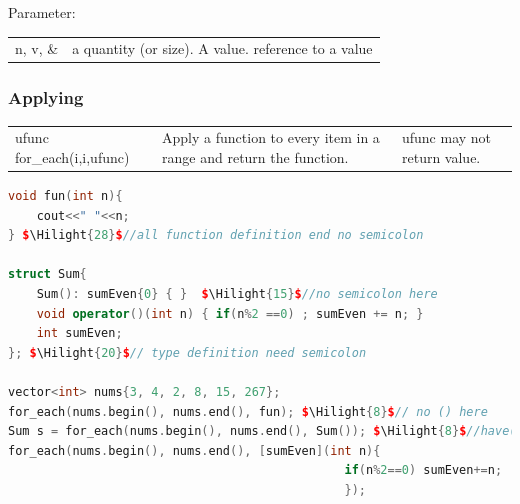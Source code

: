 \documentclass[a4paper,11pt,twoside]{book}
\newcommand{\Hilight}[1]{\makebox[0pt][l]{\color{yellow}\rule[-3pt]{#1em}{11pt}}}
\newcommand{\Hilight}[1]{}
\renewcommand{\hline}{}
\begin{document}
Parameter:  \\
\begin{tabular}{| p{} |p{}|}
\hline n, v, \&  & 	a quantity (or size). A value. reference to a value \\
\hline
\end{tabular}

\subsubsection{Applying}
\begin{tabular}{| p{} |p{}|p{}|}
\hline ufunc for\_each(i,i,ufunc) &Apply a function to every item in a range and return the function. &  ufunc may not return value.  \\
\hline
\end{tabular}

\begin{lstlisting}[frame=single, language=c++, mathescape=true]
void fun(int n){
    cout<<" "<<n;
} $\Hilight{28}$//all function definition end no semicolon

struct Sum{
    Sum(): sumEven{0} { }  $\Hilight{15}$//no semicolon here
    void operator()(int n) { if(n%2 ==0) ; sumEven += n; }
    int sumEven;
}; $\Hilight{20}$// type definition need semicolon

vector<int> nums{3, 4, 2, 8, 15, 267};
for_each(nums.begin(), nums.end(), fun); $\Hilight{8}$// no () here
Sum s = for_each(nums.begin(), nums.end(), Sum()); $\Hilight{8}$//have() here
for_each(nums.begin(), nums.end(), [sumEven](int n){
                                               if(n%2==0) sumEven+=n;
                                               });
\end{lstlisting}
\end{document}
